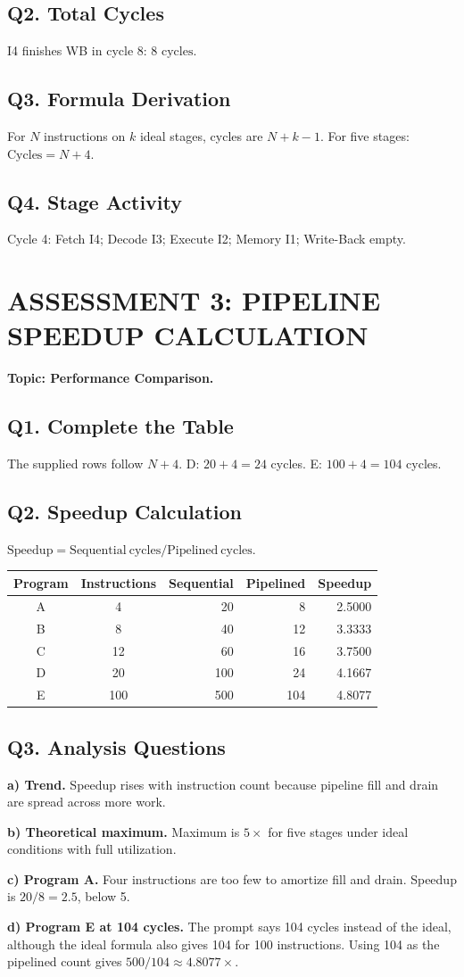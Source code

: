\documentclass[11pt,letterpaper]{article}
\begin{document}
\subsection*{Q2. Total Cycles}
I4 finishes WB in cycle 8: $\boxed{8\text{ cycles}}$.
\subsection*{Q3. Formula Derivation}
For $N$ instructions on $k$ ideal stages, cycles are $N+k-1$. For five stages: $\boxed{\mathrm{Cycles}=N+4}$.
\subsection*{Q4. Stage Activity}
Cycle 4: Fetch I4; Decode I3; Execute I2; Memory I1; Write-Back empty.

\section{ASSESSMENT 3: PIPELINE SPEEDUP CALCULATION}
\textbf{Topic: Performance Comparison.}
\subsection*{Q1. Complete the Table}
The supplied rows follow $N+4$. D: $20+4=\boxed{24}$ cycles. E: $100+4=\boxed{104}$ cycles.
\subsection*{Q2. Speedup Calculation}
$\mathrm{Speedup}=\mathrm{Sequential\ cycles}/\mathrm{Pipelined\ cycles}$.
\begin{center}\begin{tabular}{|c|c|r|r|r|}\hline\textbf{Program}&\textbf{Instructions}&\textbf{Sequential}&\textbf{Pipelined}&\textbf{Speedup}\\\hline
A&4&20&8&2.5000\\\hline B&8&40&12&3.3333\\\hline C&12&60&16&3.7500\\\hline D&20&100&24&4.1667\\\hline E&100&500&104&4.8077\\\hline\end{tabular}\end{center}
\subsection*{Q3. Analysis Questions}
\textbf{a) Trend.} Speedup rises with instruction count because pipeline fill and drain are spread across more work.\par\smallskip
\textbf{b) Theoretical maximum.} Maximum is $\boxed{5\times}$ for five stages under ideal conditions with full utilization.\par\smallskip
\textbf{c) Program A.} Four instructions are too few to amortize fill and drain. Speedup is $20/8=2.5$, below 5.\par\smallskip
\textbf{d) Program E at 104 cycles.} The prompt says 104 cycles instead of the ideal, although the ideal formula also gives 104 for 100 instructions. Using 104 as the pipelined count gives $500/104\approx\boxed{4.8077\times}$.
\end{document}
